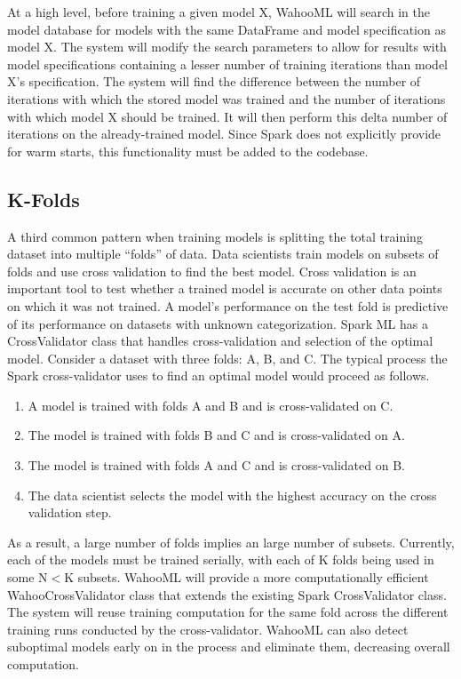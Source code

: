 \documentclass[../proposal.tex]{subfiles}
\begin{document}
At a high level, before training a given model X, WahooML will search in the
model database for models with the same DataFrame and model specification as
model X. The system will modify the search parameters to allow for results with
model specifications containing a lesser number of training iterations than
model X's specification. The system will find the difference between the number
of iterations with which the stored model was trained and the number of
iterations with which model X should be trained. It will then perform this
delta number of iterations on the already-trained model. Since Spark does not
explicitly provide for warm starts, this functionality must be added to the
codebase.

\subsection{K-Folds}

A third common pattern when training models is splitting the total training
dataset into multiple ``folds'' of data. Data scientists train models on
subsets of folds and use cross validation to find the best model. Cross
validation is an important tool to test whether a trained model is accurate on
other data points on which it was not trained. A model's performance on the
test fold is predictive of its performance on datasets with unknown
categorization. Spark ML has a CrossValidator class that handles
cross-validation and selection of the optimal model. Consider a dataset with
three folds: A, B, and C. The typical process the Spark cross-validator uses to
find an optimal model would proceed as follows.

\begin{enumerate}[topsep=0pt,itemsep=-1ex,partopsep=1ex,parsep=1ex]
\item A model is trained with folds A and B and is cross-validated on C.
\item The model is trained with folds B and C and is cross-validated on A.
\item The model is trained with folds A and C and is cross-validated on B.

\item The data scientist selects the model with the highest accuracy on the
cross validation step.
\end{enumerate}

As a result, a large number of folds implies an large number of subsets.
Currently, each of the models must be trained serially, with each of K folds
being used in some N$<$K subsets. WahooML will provide a more computationally
efficient WahooCrossValidator class that extends the existing Spark
CrossValidator class. The system will reuse training computation for the same
fold across the different training runs conducted by the cross-validator.
WahooML can also detect suboptimal models early on in the process and eliminate
them, decreasing overall computation.
\end{document}

